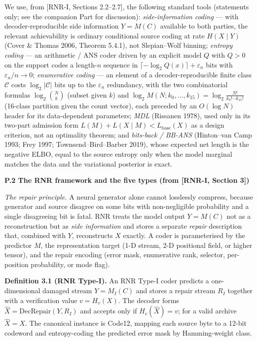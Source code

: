 \documentclass[
]{article}
\begin{document}
We use, from [RNR-I, Sections 2.2--2.7], the following standard tools
(statements only; see the companion Part for discussion):
\emph{side-information coding} --- with decoder-reproducible side
information $Y = M(C)$ available to both parties, the relevant
achievability is ordinary conditional source coding at rate
$H(X \mid Y)$ (Cover \& Thomas 2006, Theorem 5.4.1), not Slepian--Wolf
binning; \emph{entropy coding} --- an arithmetic / ANS coder driven by an
explicit model $Q$ with $Q>0$ on the support codes a length-$n$ sequence in
$\lceil -\log_2 Q(x)\rceil + \varepsilon_n$ bits with
$\varepsilon_n / n \to 0$; \emph{enumerative coding} --- an element of a
decoder-reproducible finite class $\mathcal{C}$ costs $\log_2|\mathcal{C}|$
bits up to the $\varepsilon_n$ redundancy, with the two combinatorial
formulas $\log_2\binom{N}{k}$ (subset given $k$) and
$\log_2 M(N;k_0,\dots,k_{15}) = \log_2 \frac{N!}{k_0!\cdots k_{15}!}$
(16-class partition given the count vector), each preceded by an
$O(\log N)$ header for its data-dependent parameters; \emph{MDL} (Rissanen
1978), used only in its two-part admission form
$L(M) + L(X\mid M) < L_{\mathrm{base}}(X)$ as a design criterion, not an
optimality theorem; and \emph{bits-back / BB-ANS} (Hinton--van Camp 1993;
Frey 1997; Townsend--Bird--Barber 2019), whose expected net length is the
negative ELBO, equal to the source entropy only when the model marginal
matches the data and the variational posterior is exact.

\textbf{P.2 The RNR framework and the five types (from [RNR-I, Section 3])}

\emph{The repair principle.} A neural generator alone cannot losslessly
compress, because generator and source disagree on some bits with
non-negligible probability and a single disagreeing bit is fatal. RNR
treats the model output $Y = M(C)$ not as a reconstruction but as
\emph{side information} and stores a separate \emph{repair} description
that, combined with $Y$, reconstructs $X$ exactly. A coder is parameterised
by the predictor $M$, the representation target (1-D stream, 2-D positional
field, or higher tensor), and the repair encoding (error mask, enumerative
rank, selector, per-position probability, or mode flag).

\textbf{Definition 3.1 (RNR Type-I).} An RNR Type-I coder predicts a
one-dimensional damaged stream $Y = M_I(C)$ and stores a repair stream
$R_I$ together with a verification value $v = H_v(X)$. The decoder forms
$\hat{X} = \mathrm{DecRepair}(Y, R_I)$ and accepts only if
$H_v(\hat{X}) = v$; for a valid archive $\hat{X} = X$. The canonical
instance is Code12, mapping each source byte to a 12-bit codeword and
entropy-coding the predicted error mask by Hamming-weight class.
\end{document}

